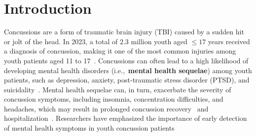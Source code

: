 \section{Introduction}
Concussions are a form of traumatic brain injury (TBI) caused by a sudden hit or jolt of the head.
In 2023, a total of $2.3$ million youth aged $\leq17$ years received a diagnosis of concussion, making it one of the most common injuries among youth patients aged 11 to 17~\cite{yang2021association,miller2022salivary,rivara2014sports,bryan2016sports}.
Concussions can often lead to a high likelihood of developing mental health disorders (i.e.,~\textbf{mental health sequelae}) among youth patients, such as depression, anxiety, post-traumatic stress disorder (PTSD), and suicidality~\cite{fralick2019association,ceniti2022psychological,gornall2021mental}.
Mental health sequelae can, in turn, exacerbate the severity of concussion symptoms, including insomnia, concentration difficulties, and headaches, which may result in prolonged concussion recovery~\cite{gornall2021mental,iverson2003examination,ceniti2022psychological} and hospitalization~\cite{ledoux2022risk}.
Researchers have emphasized the importance of early detection of mental health symptoms in youth concussion patients~\cite{miller2021association, brooks2019predicting, gornall2021mental, brent2017psychiatric}
